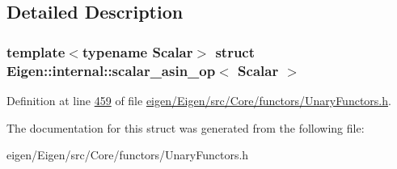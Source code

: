 \subsection{Detailed Description}
\subsubsection*{template$<$typename Scalar$>$\newline
struct Eigen\+::internal\+::scalar\+\_\+asin\+\_\+op$<$ Scalar $>$}



Definition at line \hyperlink{eigen_2_eigen_2src_2_core_2functors_2_unary_functors_8h_source_l00459}{459} of file \hyperlink{eigen_2_eigen_2src_2_core_2functors_2_unary_functors_8h_source}{eigen/\+Eigen/src/\+Core/functors/\+Unary\+Functors.\+h}.



The documentation for this struct was generated from the following file\+:\begin{DoxyCompactItemize}
\item 
eigen/\+Eigen/src/\+Core/functors/\+Unary\+Functors.\+h\end{DoxyCompactItemize}

